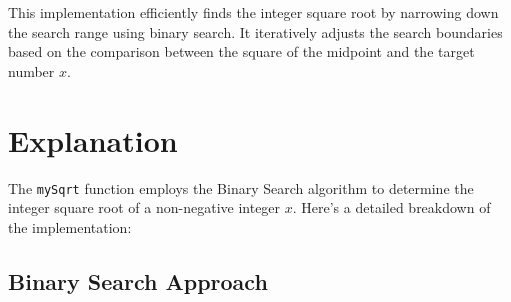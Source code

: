 This implementation efficiently finds the integer square root by narrowing down the search range using binary search. It iteratively adjusts the search boundaries based on the comparison between the square of the midpoint and the target number \(x\).

\section*{Explanation}

The \texttt{mySqrt} function employs the Binary Search algorithm to determine the integer square root of a non-negative integer \(x\). Here's a detailed breakdown of the implementation:

\subsection*{Binary Search Approach}

